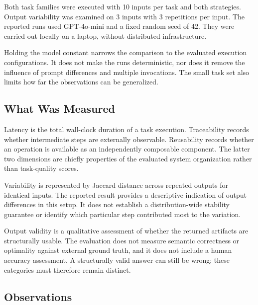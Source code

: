 \documentclass[10pt,twocolumn,a4paper]{article}
\begin{document}
Both task families were executed with 10 inputs per task and both strategies. Output variability was examined on 3 inputs with 3 repetitions per input. The reported runs used GPT-4o-mini and a fixed random seed of 42. They were carried out locally on a laptop, without distributed infrastructure.


Holding the model constant narrows the comparison to the evaluated execution configurations. It does not make the runs deterministic, nor does it remove the influence of prompt differences and multiple invocations. The small task set also limits how far the observations can be generalized.


\subsection{What Was Measured}

Latency is the total wall-clock duration of a task execution. Traceability records whether intermediate steps are externally observable. Reusability records whether an operation is available as an independently composable component. The latter two dimensions are chiefly properties of the evaluated system organization rather than task-quality scores.


Variability is represented by Jaccard distance across repeated outputs for identical inputs. The reported result provides a descriptive indication of output differences in this setup. It does not establish a distribution-wide stability guarantee or identify which particular step contributed most to the variation.


Output validity is a qualitative assessment of whether the returned artifacts are structurally usable. The evaluation does not measure semantic correctness or optimality against external ground truth, and it does not include a human accuracy assessment. A structurally valid answer can still be wrong; these categories must therefore remain distinct.


\subsection{Observations}
\end{document}
